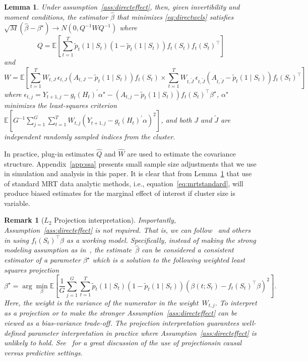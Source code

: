 \documentclass[12pt]{article}
\newtheorem{lemma}[thm]{Lemma}
\newtheorem{remark}[thm]{Remark}%
\newcommand{\zw}[1]{\textcolor{blue}{[\textit{ZW: #1}]}}
\begin{document}
\begin{lemma}
\label{lemma:asymnorm}
Under assumption~\ref{ass:directeffect}, then, given invertibility and moment conditions, the estimator $\hat \beta$ that minimizes \eqref{eq:directwcls} satisfies $\sqrt{M} \left(\hat \beta - \beta^\star \right) \to N(0, Q^{-1} W Q^{-1})$ where
$$
Q = \mathbb{E} \left[ \sum_{t=1}^T \tilde p_t( 1 \mid S_{t} ) ( 1- \tilde p_t( 1 \mid S_{t} )) f_t (S_t) f_t (S_t)^\top \right]
$$
and
$$
W =  \mathbb{E} \left[ \sum_{t=1}^T W_{t,J} \, \epsilon_{t,J} ( A_{t,J} - \tilde p_t( 1 \mid S_{t} )) f_t (S_t) \times \sum_{t=1}^T W_{t, \tilde J} \, \epsilon_{t, \tilde J} ( A_{t, \tilde J} - \tilde p_t( 1 \mid S_{t} )) f_t (S_t)^\top  \right]
$$
where $\epsilon_{t,j} = Y_{t+1, j} - g_t(H_t)^\prime \alpha^\star - (A_{t,j} - \tilde p_t (1 \mid S_t) ) f_t (S_t)^\top \beta^\star$, $\alpha^\star$ minimizes the least-squares criterion $\mathbb{E}  \left[G^{-1} \sum_{j=1}^G \sum_{t=1}^T W_{t,j} \left( Y_{t+1,j} - g_t(H_t)^\prime \alpha \right)^2 \right]$, and both $J$ and $\tilde J$ are independent randomly sampled indices from the cluster.
\end{lemma}

\noindent In practice, plug-in estimates $\hat Q$ and $\hat W$ are used to estimate the covariance structure. Appendix~\ref{app:ssa} presents small sample size adjustments that we use in simulation and analysis in this paper.  It is clear that from Lemma~\ref{lemma:asymnorm} that use of standard MRT data analytic methods, i.e., equation~\eqref{eq:mrtstandard}, will produce biased estimates for the marginal effect of interest if cluster size is variable.

\begin{remark}[$L_2$ Projection interpretation]
\label{rmk:l2proj}
\normalfont
Importantly, Assumption~\ref{ass:directeffect} is not required.  That is, we can follow~\cite{Neugebauer2007,Rosenblum2010,Kennedy2019,DempseyAOAS} and others in using $f_t (S_t)^\top \beta$ as a working model.  Specifically, instead of making the strong modeling assumption as in~\cite{Boruvkaetal}, the estimate~$\hat \beta$ can be considered a consistent estimator of a parameter $\beta^\star$ which is a solution to the following weighted least squares projection
$$
\beta^\star = \arg \min_{\beta} \mathbb{E} \left[ \frac{1}{G} \sum_{j=1}^G \sum_{t=1}^T \tilde p_t(1 \mid S_t) \left( 1 - \tilde p_t(1 \mid S_t) \right) \left( \beta(t; S_t) - f_t (S_t)^\top \beta \right)^2 \right].
$$
Here, the weight is the variance of the numerator in the weight~$W_{t,j}$.  To interpret as a projection or to make the stronger Assumption~\ref{ass:directeffect} can be viewed as a bias-variance trade-off.  The projection interpretation guarantees well-defined parameter interpretation in practice where Assumption~\ref{ass:directeffect} is unlikely to hold.  See~\cite[Sec. 3.1, pp.9--10]{Kennedy2019} for a great discussion of the use of projectionsin causal versus predictive settings.
\end{remark}
\end{document}
